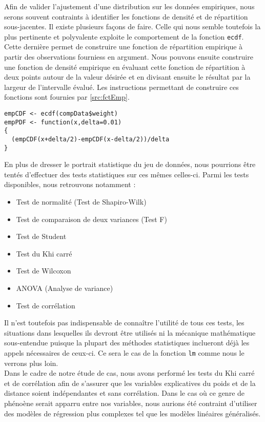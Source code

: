 Afin de valider l'ajustement d'une distribution sur les données empiriques, nous serons souvent contraints à identifier les fonctions de densité et de répartition sous-jacentes. Il existe plusieurs façons de faire. Celle qui nous semble toutefois la plus pertinente et polyvalente exploite le comportement de la fonction \texttt{ecdf}. Cette dernière permet de construire une fonction de répartition empirique à partir des observations fourniess en argument. Nous pouvons ensuite construire une fonction de densité empirique en évaluant cette fonction de répartition à deux points autour de la valeur désirée et en divisant ensuite le résultat par la largeur de l'intervalle évalué. Les instructions permettant de construire ces fonctions sont fournies par \autoref{src:fctEmp}. \\

\begin{lstlisting}[caption = Fonctions de densité et de répartition empiriques,label=src:fctEmp]
empCDF <- ecdf(compData$weight)
empPDF <- function(x,delta=0.01)
{
  (empCDF(x+delta/2)-empCDF(x-delta/2))/delta
}
\end{lstlisting}

\vspace{\baselineskip}
En plus de dresser le portrait statistique du jeu de données, nous pourrions être tentés d'effectuer des tests statistiques sur ces mêmes celles-ci. Parmi les tests disponibles, nous retrouvons notamment :
\begin{itemize}
	\item Test de normalité (Test de Shapiro-Wilk)
	\item Test de comparaison de deux variances (Test F)
	\item Test de Student
	\item Test du Khi carré
	\item Test de Wilcoxon
	\item ANOVA (Analyse de variance)
	\item Test de corrélation
\end{itemize}
Il n'est toutefois pas indispensable de connaître l'utilité de tous ces tests, les situations dans lesquelles ils devront être utilisés ni la mécanique mathématique sous-entendue puisque la plupart des méthodes statistiques inclueront déjà les appels nécessaires de ceux-ci. Ce sera le cas de la fonction \texttt{lm} comme nous le verrons plus loin. \cite{testStatsR} \\

Dans le cadre de notre étude de cas, nous avons performé les tests du Khi carré et de corrélation afin de s'assurer que les variables explicatives du poids et de la distance soient indépendantes et sans corrélation. Dans le cas où ce genre de phénoène serait apparru entre nos variables, nous aurions été contraint d'utiliser des modèles de régression plus complexes tel que les modèles linéaires généralisés. \\

